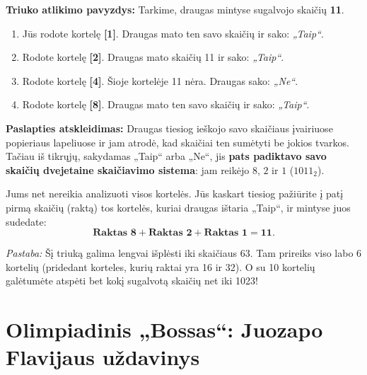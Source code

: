 \documentclass[11pt,a4paper]{scrartcl}
\begin{document}
\textbf{Triuko atlikimo pavyzdys:}
Tarkime, draugas mintyse sugalvojo skaičių \textbf{11}.
\begin{enumerate}
    \item Jūs rodote kortelę \textbf{[1]}. Draugas mato ten savo skaičių ir sako: \textit{„Taip“}.
    \item Rodote kortelę \textbf{[2]}. Draugas mato skaičių 11 ir sako: \textit{„Taip“}.
    \item Rodote kortelę \textbf{[4]}. Šioje kortelėje 11 nėra. Draugas sako: \textit{„Ne“}.
    \item Rodote kortelę \textbf{[8]}. Draugas mato ten savo skaičių ir sako: \textit{„Taip“}.
\end{enumerate}

\textbf{Paslapties atskleidimas:} 
Draugas tiesiog ieškojo savo skaičiaus įvairiuose popieriaus lapeliuose ir jam atrodė, kad skaičiai ten sumėtyti be jokios tvarkos. Tačiau iš tikrųjų, sakydamas „Taip“ arba „Ne“, jis \textbf{pats padiktavo savo skaičių dvejetaine skaičiavimo sistema}: jam reikėjo $8$, $2$ ir $1$ ($1011_2$). 

Jums net nereikia analizuoti visos kortelės. Jūs kaskart tiesiog pažiūrite į patį pirmą skaičių (raktą) tos kortelės, kuriai draugas ištaria „Taip“, ir mintyse juos sudedate:
\[ \textbf{Raktas 8} + \textbf{Raktas 2} + \textbf{Raktas 1} = \textbf{11}. \]

\textit{Pastaba:} Šį triuką galima lengvai išplėsti iki skaičiaus $63$. Tam prireiks viso labo 6 kortelių (pridedant korteles, kurių raktai yra 16 ir 32). O su 10 kortelių galėtumėte atspėti bet kokį sugalvotą skaičių net iki 1023!

\section{Olimpiadinis „Bossas“: Juozapo Flavijaus uždavinys}
\end{document}
